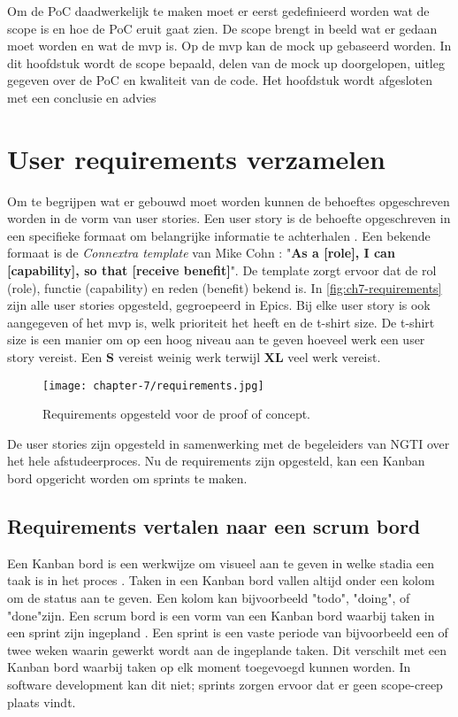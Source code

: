 Om de PoC daadwerkelijk te maken moet er eerst gedefinieerd worden wat de scope is en hoe de PoC eruit gaat zien. De scope brengt in beeld wat er gedaan moet worden en wat de \acrfull{mvp} is. Op de \acrshort{mvp} kan de mock up gebaseerd worden. In dit hoofdstuk wordt de scope bepaald, delen van de mock up doorgelopen, uitleg gegeven over de PoC en kwaliteit van de code. Het hoofdstuk wordt afgesloten met een conclusie en advies

\section{User requirements verzamelen}\label{sec:ch7-user-requirements-verzamelen}
Om te begrijpen wat er gebouwd moet worden kunnen de behoeftes opgeschreven worden in de vorm van user stories. Een user story is de behoefte opgeschreven in een specifieke formaat om belangrijke informatie te achterhalen \cite{agile-user-story-template}. Een bekende formaat is de \textit{Connextra template} van Mike Cohn \cite{agile-user-story-template}: "\textbf{As a [role], I can [capability], so that [receive benefit]}". De template zorgt ervoor dat de rol (role), functie (capability) en reden (benefit) bekend is. In \autoref{fig:ch7-requirements} zijn alle user stories opgesteld, gegroepeerd in Epics. Bij elke user story is ook aangegeven of het \acrshort{mvp} is, welk prioriteit het heeft en de t-shirt size. De t-shirt size is een manier om op een hoog niveau aan te geven hoeveel werk een user story vereist. Een \textbf{S} vereist weinig werk terwijl \textbf{XL} veel werk vereist.

\begin{figure}[hbt!]
  \centering
  \texttt{[image: chapter-7/requirements.jpg]}
  \caption{Requirements opgesteld voor de proof of concept.}
  \label{fig:ch7-requirements}
\end{figure}

De user stories zijn opgesteld in samenwerking met de begeleiders van NGTI over het hele afstudeerproces. Nu de requirements zijn opgesteld, kan een Kanban bord opgericht worden om sprints te maken.

\newpage

\subsection{Requirements vertalen naar een scrum bord}\label{subsec:ch7-requirements-vertalen-naar-een-scrum-bord}
Een Kanban bord is een werkwijze om visueel aan te geven in welke stadia een taak is in het proces \cite{atlassian-kanban-board}. Taken in een Kanban bord vallen altijd onder een kolom om de status aan te geven. Een kolom kan bijvoorbeeld "todo", "doing", of "done"\space zijn. Een scrum bord is een vorm van een Kanban bord waarbij taken in een sprint zijn ingepland \cite{forecast-scrum-board}. Een sprint is een vaste periode van bijvoorbeeld een of twee weken waarin gewerkt wordt aan de ingeplande taken. Dit verschilt met een Kanban bord waarbij taken op elk moment toegevoegd kunnen worden. In software development kan dit niet; sprints zorgen ervoor dat er geen \gls{scope-creep} plaats vindt.


